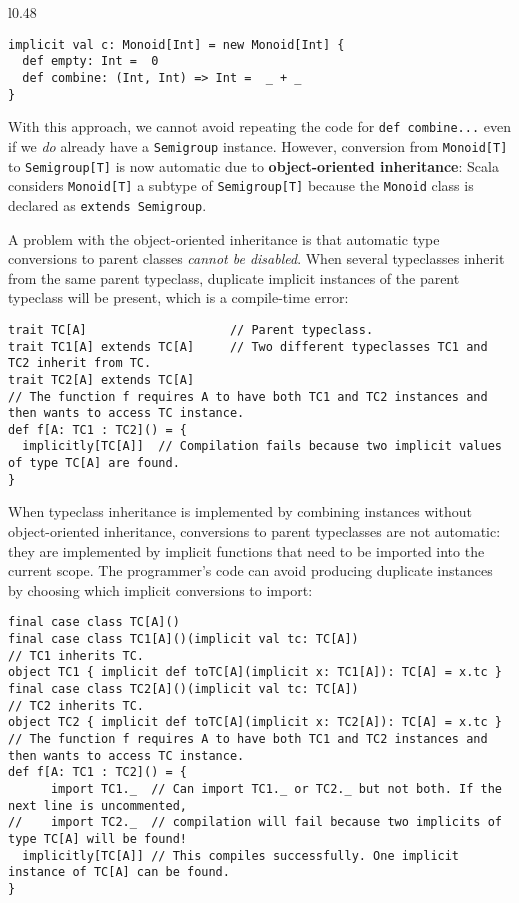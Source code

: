\begin{wrapfigure}{l}{0.48\columnwidth}%
\vspace{-0.95\baselineskip}
\begin{lstlisting}
implicit val c: Monoid[Int] = new Monoid[Int] {
  def empty: Int =  0
  def combine: (Int, Int) => Int =  _ + _
}
\end{lstlisting}

\vspace{-1.1\baselineskip}
\end{wrapfigure}%

\noindent With this approach, we cannot avoid repeating the code for
\lstinline!def combine...! even if we \emph{do} already have a \lstinline!Semigroup!
instance. However, conversion from \lstinline!Monoid[T]! to \lstinline!Semigroup[T]!
is now automatic due to \textbf{object-oriented inheritance}:
Scala considers \lstinline!Monoid[T]! a subtype of \lstinline!Semigroup[T]!
because the \lstinline!Monoid! class is declared as \lstinline!extends Semigroup!.

A problem with the object-oriented inheritance is that automatic type
conversions to parent classes \emph{cannot be disabled}. When several
typeclasses inherit from the same parent typeclass, duplicate implicit
instances of the parent typeclass will be present, which is a compile-time
error:
\begin{lstlisting}
trait TC[A]                    // Parent typeclass.
trait TC1[A] extends TC[A]     // Two different typeclasses TC1 and TC2 inherit from TC.
trait TC2[A] extends TC[A]
// The function f requires A to have both TC1 and TC2 instances and then wants to access TC instance.
def f[A: TC1 : TC2]() = {
  implicitly[TC[A]]  // Compilation fails because two implicit values of type TC[A] are found.
}
\end{lstlisting}

When typeclass inheritance is implemented by combining instances without
object-oriented inheritance, conversions to parent typeclasses are
not automatic: they are implemented by implicit functions that need
to be imported into the current scope. The programmer\textsf{'}s code can avoid
producing duplicate instances by choosing which implicit conversions
to import:
\begin{lstlisting}
final case class TC[A]()
final case class TC1[A]()(implicit val tc: TC[A])                      // TC1 inherits TC.
object TC1 { implicit def toTC[A](implicit x: TC1[A]): TC[A] = x.tc }
final case class TC2[A]()(implicit val tc: TC[A])                      // TC2 inherits TC.
object TC2 { implicit def toTC[A](implicit x: TC2[A]): TC[A] = x.tc }
// The function f requires A to have both TC1 and TC2 instances and then wants to access TC instance.
def f[A: TC1 : TC2]() = {
      import TC1._  // Can import TC1._ or TC2._ but not both. If the next line is uncommented,
//    import TC2._  // compilation will fail because two implicits of type TC[A] will be found!
  implicitly[TC[A]] // This compiles successfully. One implicit instance of TC[A] can be found.
}
\end{lstlisting}

